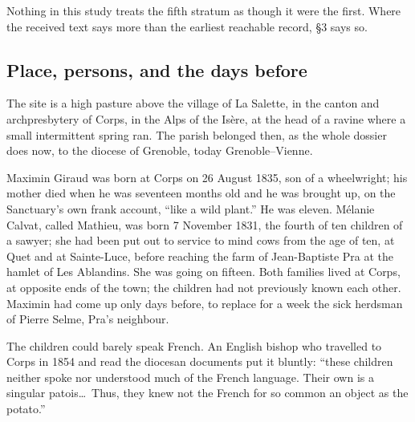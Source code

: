 Nothing in this study treats the fifth stratum as though it were the
first. Where the received text says more than the earliest reachable
record, \S3 says so.

\subsection{Place, persons, and the days before}

The site is a high pasture above the village of La Salette, in the
canton and archpresbytery of Corps, in the Alps of the Isère, at the
head of a ravine where a small intermittent spring ran. The parish
belonged then, as the whole dossier does now, to the diocese of
Grenoble, today Grenoble--Vienne.

Maximin Giraud was born at Corps on 26 August 1835, son of a
wheelwright; his mother died when he was seventeen months old and he
was brought up, on the Sanctuary's own frank account, ``like a wild
plant.'' He was eleven. Mélanie Calvat, called Mathieu, was born
7 November 1831, the fourth of ten children of a sawyer; she had
been put out to service to mind cows from the age of ten, at Quet
and at Sainte-Luce, before reaching the farm of Jean-Baptiste Pra at
the hamlet of Les Ablandins. She was going on fifteen. Both families
lived at Corps, at opposite ends of the town; the children had not
previously known each other. Maximin had come up only days before,
to replace for a week the sick herdsman of Pierre Selme, Pra's
neighbour.

The children could barely speak French. An English bishop who
travelled to Corps in 1854 and read the diocesan documents put it
bluntly: ``these children neither spoke nor understood much of the
French language. Their own is a singular patois\ldots\ Thus, they
knew not the French for so common an object as the
potato.''

